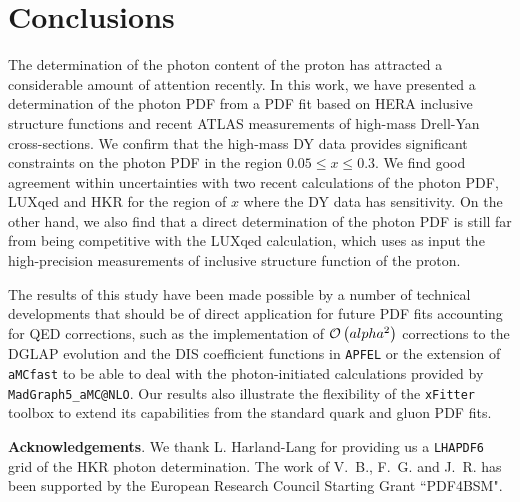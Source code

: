\section{Conclusions}

\label{sec:conclusions}

The determination of the photon content of the proton has
attracted a considerable amount of attention recently.
%
In this work, we have presented a determination of the photon PDF from
a PDF fit based on HERA inclusive structure functions and recent ATLAS measurements
of high-mass Drell-Yan cross-sections.
%
We confirm that the high-mass DY data provides significant constraints on the photon PDF
in the region $0.05 \le x \le 0.3$.
%
We find good agreement within uncertainties with two recent calculations of the photon PDF,
LUXqed and HKR for the region of $x$ where the DY data has sensitivity.
%
On the other hand, we also find that a direct determination of the photon PDF
is still far from being competitive with the LUXqed calculation, which uses as input
the high-precision measurements of inclusive structure function of the proton.

The results of this study have been made possible by a number of technical developments
that should be of direct application for future PDF fits accounting for QED corrections,
such as the implementation of $\mathcal{O}\left( alpha^2\right)$ corrections to the DGLAP
evolution and the DIS coefficient functions in {\tt APFEL} or the extension of
{\tt aMCfast} to be able to deal with the photon-initiated calculations provided
by {\tt MadGraph5\_aMC@NLO}.
%
Our results also illustrate the flexibility of the {\tt xFitter} toolbox to extend
its capabilities from the standard quark and gluon PDF fits.


{\bf Acknowledgements}.
%
We thank L. Harland-Lang for providing us a {\tt LHAPDF6} grid
of the HKR photon determination.
%
The work of V.~B., F.~G. and J.~R. has been supported
by the European Research Council Starting Grant ``PDF4BSM".




